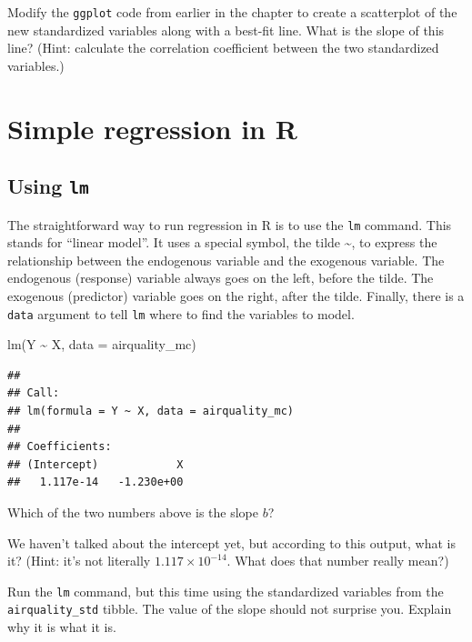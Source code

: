 \documentclass[
]{book}
\newenvironment{Shaded}{\begin{snugshade}}{\end{snugshade}}
\newcommand{\AttributeTok}[1]{\textcolor[rgb]{0.77,0.63,0.00}{#1}}
\newcommand{\FunctionTok}[1]{\textcolor[rgb]{0.00,0.00,0.00}{#1}}
\newcommand{\NormalTok}[1]{#1}
\newcommand{\SpecialCharTok}[1]{\textcolor[rgb]{0.00,0.00,0.00}{#1}}
\begin{document}
Modify the \texttt{ggplot} code from earlier in the chapter to create a scatterplot of the new standardized variables along with a best-fit line. What is the slope of this line? (Hint: calculate the correlation coefficient between the two standardized variables.)

\hypertarget{simple-r}{%
\section{Simple regression in R}\label{simple-r}}

\hypertarget{simple-r-lm}{%
\subsection{\texorpdfstring{Using \texttt{lm}}{Using lm}}\label{simple-r-lm}}

The straightforward way to run regression in R is to use the \texttt{lm} command. This stands for ``linear model''. It uses a special symbol, the tilde \textasciitilde, to express the relationship between the endogenous variable and the exogenous variable. The endogenous (response) variable always goes on the left, before the tilde. The exogenous (predictor) variable goes on the right, after the tilde. Finally, there is a \texttt{data} argument to tell \texttt{lm} where to find the variables to model.

\begin{Shaded}
\begin{Highlighting}[]
\FunctionTok{lm}\NormalTok{(Y }\SpecialCharTok{\textasciitilde{}}\NormalTok{ X, }\AttributeTok{data =}\NormalTok{ airquality\_mc)}
\end{Highlighting}
\end{Shaded}

\begin{verbatim}
## 
## Call:
## lm(formula = Y ~ X, data = airquality_mc)
## 
## Coefficients:
## (Intercept)            X  
##   1.117e-14   -1.230e+00
\end{verbatim}

Which of the two numbers above is the slope \(b\)?

We haven't talked about the intercept yet, but according to this output, what is it? (Hint: it's not literally \(1.117 \times 10^{-14}\). What does that number really mean?)

Run the \texttt{lm} command, but this time using the standardized variables from the \texttt{airquality\_std} tibble. The value of the slope should not surprise you. Explain why it is what it is.
\end{document}
